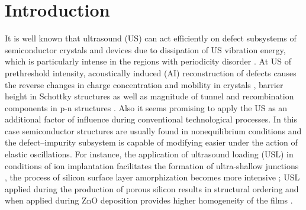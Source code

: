 \documentclass[sn-mathphys]{sn-jnl}%
\theoremstyle{thmstyleone}%
\theoremstyle{thmstyletwo}%
\theoremstyle{thmstylethree}%
\begin{document}
\section{Introduction}\label{sec1}

It is well known that ultrasound (US) can act efficiently on defect subsystems of semiconductor crystals and devices due to dissipation of US vibration energy, which is particularly intense in the regions with periodicity disorder \cite{ostapenko2002,Savkina2013,Olikh2018JAP}.
At US of prethreshold intensity, acoustically induced (AI) reconstruction of defects causes the reverse changes in charge concentration and mobility in crystals \cite{Davletova2008,Olikh2020JEM},
barrier height in Schottky structures \cite{Olikh:Ultras,OlikhJAP}
as well as magnitude of tunnel and recombination components in p-n structures \cite{Teterkin2009,Olikh2018JAP}.
Also it seems promising to apply the US as an additional factor of influence during conventional technological processes.
In this case semiconductor structures are usually found in  nonequilibrium conditions and the defect--impurity subsystem is capable of modifying easier under the action of elastic oscillations.
For instance, the application of ultrasound loading (USL) in conditions of ion implantation facilitates
the formation of ultra-shallow junctions \cite{USImplant:JVacSci},
the process of silicon surface layer amorphization becomes more intensive \cite{RomanyukSST};
USL applied during the production of porous silicon  results in structural ordering \cite{Kalem2000}
and when applied during ZnO deposition provides higher homogeneity of the films \cite{US:ZnOfilm}.
\end{document}
